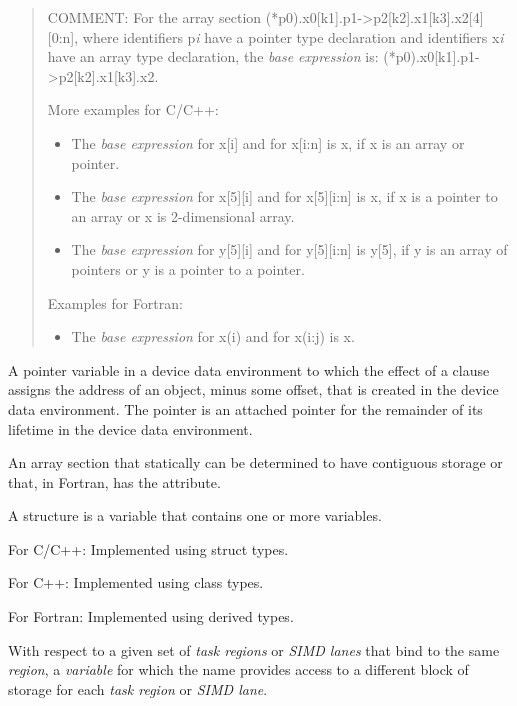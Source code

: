 \begin{quote}
COMMENT: For the array section (*p0).x0[k1].p1->p2[k2].x1[k3].x2[4][0:n],
where identifiers p\emph{i} have a pointer type declaration and
identifiers x\emph{i} have an array type declaration, the
\emph{base expression} is:
(*p0).x0[k1].p1->p2[k2].x1[k3].x2.

More examples for C/C++:
\begin{itemize}
\item The \emph{base expression} for x[i] and for 
    x[i:n] is x, if x is an array or pointer.
\item The \emph{base expression} for x[5][i] and for x[5][i:n] is x, if x is a
    pointer to an array or x is 2-dimensional array.
\item The \emph{base expression} for y[5][i] and for y[5][i:n] is y[5], if
    y is an array of pointers or y is a pointer to a pointer.
\end{itemize}
Examples for Fortran:
\begin{itemize}
\item The \emph{base expression} for x(i) and for x(i:j) is x.
\end{itemize}
\end{quote}
\glossarydefend


\glossarydefstart
A pointer variable in a device data environment to which the effect of a
 clause assigns the address of an object, minus some offset,  that
is created in the device data environment. The pointer is an attached pointer
for the remainder of its lifetime in the device data environment.
\glossarydefend
\bigskip

\glossarydefstart
An array section that statically can be determined to have contiguous 
storage or that, in Fortran, has the  attribute.
\glossarydefend
\bigskip

\glossarydefstart
A structure is a variable that contains one or more variables.

For C/C++:
\nopagebreak
Implemented using struct types.

For C++:
\nopagebreak
Implemented using class types.

For Fortran:
\nopagebreak
Implemented using derived types.
\glossarydefend

\glossarydefstart
With respect to a given set of \emph{task regions} or \emph{SIMD lanes} 
that bind to the same  \emph{region}, a \emph{variable} 
for which the name provides access to a different block of
storage for each \emph{task region} or \emph{SIMD lane}.

